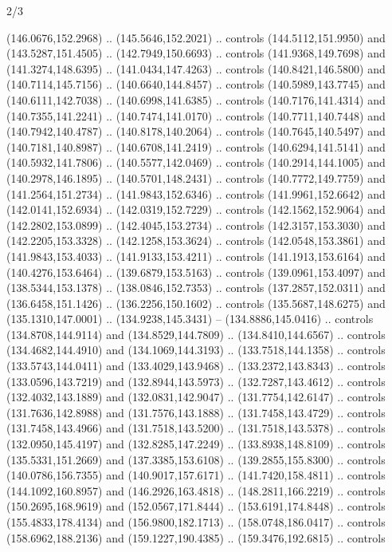 \begin{flagdescription}{2/3}
\begin{scope}[shift={(0.5\flaglength,0.5)},scale=\flagwidth/320]
\begin{scope}[y=0.8pt, x=0.8pt, yscale=-1,shift={(-118.3,-146)}]
  (146.0676,152.2968) .. (145.5646,152.2021) .. controls (144.5112,151.9950) and
  (143.5287,151.4505) .. (142.7949,150.6693) .. controls (141.9368,149.7698) and
  (141.3274,148.6395) .. (141.0434,147.4263) .. controls (140.8421,146.5800) and
  (140.7114,145.7156) .. (140.6640,144.8457) .. controls (140.5989,143.7745) and
  (140.6111,142.7038) .. (140.6998,141.6385) .. controls (140.7176,141.4314) and
  (140.7355,141.2241) .. (140.7474,141.0170) .. controls (140.7711,140.7448) and
  (140.7942,140.4787) .. (140.8178,140.2064) .. controls (140.7645,140.5497) and
  (140.7181,140.8987) .. (140.6708,141.2419) .. controls (140.6294,141.5141) and
  (140.5932,141.7806) .. (140.5577,142.0469) .. controls (140.2914,144.1005) and
  (140.2978,146.1895) .. (140.5701,148.2431) .. controls (140.7772,149.7759) and
  (141.2564,151.2734) .. (141.9843,152.6346) .. controls (141.9961,152.6642) and
  (142.0141,152.6934) .. (142.0319,152.7229) .. controls (142.1562,152.9064) and
  (142.2802,153.0899) .. (142.4045,153.2734) .. controls (142.3157,153.3030) and
  (142.2205,153.3328) .. (142.1258,153.3624) .. controls (142.0548,153.3861) and
  (141.9843,153.4033) .. (141.9133,153.4211) .. controls (141.1913,153.6164) and
  (140.4276,153.6464) .. (139.6879,153.5163) .. controls (139.0961,153.4097) and
  (138.5344,153.1378) .. (138.0846,152.7353) .. controls (137.2857,152.0311) and
  (136.6458,151.1426) .. (136.2256,150.1602) .. controls (135.5687,148.6275) and
  (135.1310,147.0001) .. (134.9238,145.3431) -- (134.8886,145.0416) .. controls
  (134.8708,144.9114) and (134.8529,144.7809) .. (134.8410,144.6567) .. controls
  (134.4682,144.4910) and (134.1069,144.3193) .. (133.7518,144.1358) .. controls
  (133.5743,144.0411) and (133.4029,143.9468) .. (133.2372,143.8343) .. controls
  (133.0596,143.7219) and (132.8944,143.5973) .. (132.7287,143.4612) .. controls
  (132.4032,143.1889) and (132.0831,142.9047) .. (131.7754,142.6147) .. controls
  (131.7636,142.8988) and (131.7576,143.1888) .. (131.7458,143.4729) .. controls
  (131.7458,143.4966) and (131.7518,143.5200) .. (131.7518,143.5378) .. controls
  (132.0950,145.4197) and (132.8285,147.2249) .. (133.8938,148.8109) .. controls
  (135.5331,151.2669) and (137.3385,153.6108) .. (139.2855,155.8300) .. controls
  (140.0786,156.7355) and (140.9017,157.6171) .. (141.7420,158.4811) .. controls
  (144.1092,160.8957) and (146.2926,163.4818) .. (148.2811,166.2219) .. controls
  (150.2695,168.9619) and (152.0567,171.8444) .. (153.6191,174.8448) .. controls
  (155.4833,178.4134) and (156.9800,182.1713) .. (158.0748,186.0417) .. controls
  (158.6962,188.2136) and (159.1227,190.4385) .. (159.3476,192.6815) .. controls

\end{scope}
\end{scope}
\end{flagdescription}
